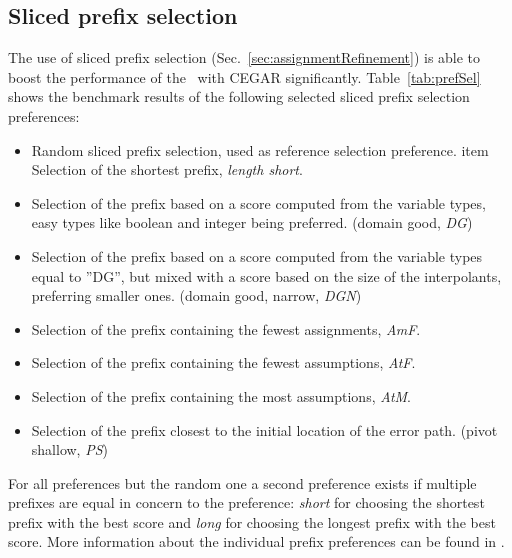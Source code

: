 \subsection{Sliced prefix selection}
The use of sliced prefix selection \cite{Beyer2015} \cite{Beyer2015a} (Sec.~\ref{sec:assignmentRefinement}) is able to boost the performance of the \symbolicExecutionCPA\ with CEGAR significantly.
Table~\ref{tab:prefSel} shows the benchmark results of the following selected sliced prefix selection preferences:
\begin{itemize}
\item Random sliced prefix selection, used as reference selection preference.
item Selection of the shortest prefix, \emph{length short}.
\item Selection of the prefix based on a score computed from the variable types, easy types like boolean and integer being preferred. (domain good, \emph{DG})
\item Selection of the prefix based on a score computed from the variable types equal to ''DG'', but mixed with a score based on the size of the interpolants, preferring smaller ones. (domain good, narrow, \emph{DGN})
\item Selection of the prefix containing the fewest assignments, \emph{AmF}.
\item Selection of the prefix containing the fewest assumptions, \emph{AtF}.
\item Selection of the prefix containing the most assumptions, \emph{AtM}.
\item Selection of the prefix closest to the initial location of the error path. (pivot shallow, \emph{PS})
\end{itemize}
For all preferences but the random one a second preference exists if multiple prefixes are equal in concern to the preference:
\emph{short} for choosing the shortest prefix with the best score and \emph{long} for choosing the longest prefix with the best score.
More information about the individual prefix preferences can be found in \cite{Beyer2015a}.

